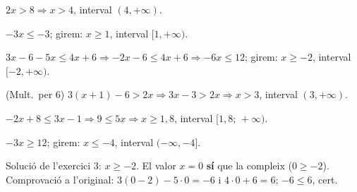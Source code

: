 \begin{solucions}
\begin{sollist}
  \item $2x>8 \Rightarrow x>4$, interval $(4,+\infty)$.
  \item $-3x\le -3$; girem: $x\ge 1$, interval $[1,+\infty)$.
  \item $3x-6-5x\le 4x+6 \Rightarrow -2x-6\le 4x+6 \Rightarrow -6x\le 12$; girem:
        $x\ge -2$, interval $[-2,+\infty)$.
  \item (Mult.\ per $6$) $3(x+1)-6>2x \Rightarrow 3x-3>2x \Rightarrow x>3$, interval
        $(3,+\infty)$.
  \item $-2x+8\le 3x-1 \Rightarrow 9\le 5x \Rightarrow x\ge 1,8$, interval
        $[1,8;\,+\infty)$.
  \item $-3x\ge 12$; girem: $x\le -4$, interval $(-\infty,-4]$.
  \item Solució de l'exercici 3: $x\ge -2$. El valor $x=0$ \textbf{sí} que la compleix
        ($0\ge -2$). Comprovació a l'original: $3(0-2)-5\cdot 0=-6$ i
        $4\cdot 0+6=6$; $-6\le 6$, cert.
\end{sollist}
\end{solucions}

